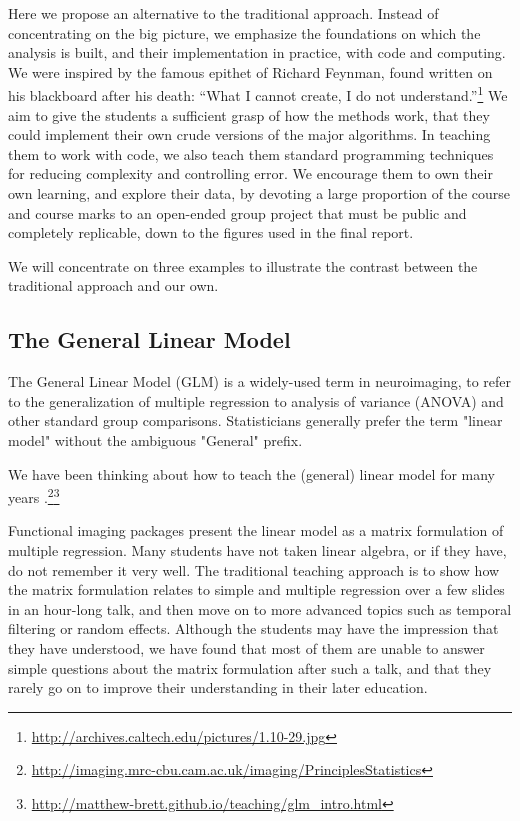 Here we propose an alternative to the traditional approach.  Instead of
concentrating on the big picture, we emphasize the foundations on which the
analysis is built, and their implementation in practice, with code and
computing.  We were inspired by the famous epithet of Richard Feynman, found
written on his blackboard after his death: ``What I cannot create, I do not
understand.''\footnote{\url{http://archives.caltech.edu/pictures/1.10-29.jpg}}
We aim to give the students a sufficient grasp of how the methods work, that
they could implement their own crude versions of the major algorithms.  In
teaching them to work with code, we also teach them standard programming
techniques for reducing complexity and controlling error.  We encourage them
to own their own learning, and explore their data, by devoting a large
proportion of the course and course marks to an open-ended group project that
must be public and completely replicable, down to the figures used in the
final report.

We will concentrate on three examples to illustrate the contrast between the
traditional approach and our own.

\subsection{The General Linear Model}

The General Linear Model (GLM) is a widely-used term in neuroimaging, to refer
to the generalization of multiple regression to analysis of variance (ANOVA)
and other standard group comparisons.  Statisticians generally prefer the term
"linear model" without the ambiguous "General" prefix.

We have been thinking about how to teach the (general) linear model for many
years
\citep{poline2012general}.\footnote{\url{http://imaging.mrc-cbu.cam.ac.uk/imaging/PrinciplesStatistics}}\footnote{\label{glm_intro}
\url{http://matthew-brett.github.io/teaching/glm_intro.html}}

Functional imaging packages present the linear model as a matrix formulation
of multiple regression.  Many students have not taken linear algebra, or if
they have, do not remember it very well.  The traditional teaching approach is
to show how the matrix formulation relates to simple and multiple regression
over a few slides in an hour-long talk, and then move on to more advanced
topics such as temporal filtering or random effects.  Although the students
may have the impression that they have understood, we have found that most of
them are unable to answer simple questions about the matrix formulation after
such a talk, and that they rarely go on to improve their understanding in
their later education.

